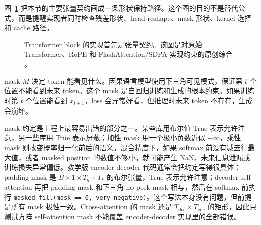 \documentclass[UTF8,zihao=-4,openany]{ctexbook}
\begin{document}
图~\ref{fig:zh-transformer-shape-contract} 把本节的主要张量契约画成一条形状保持路径。这个图的目的不是替代公式，而是提醒实现者同时检查残差形状、head reshape、mask 形状、kernel 选择和 cache 路径。

\begin{figure}[t]
\centering
{}
\caption{Transformer block 的实现首先是张量契约。该图是对原始 Transformer、RoPE 和 FlashAttention/SDPA 实现约束的原创综合 \cite{vaswani2017attention,su2021roformer,dao2022flashattention}。}
\label{fig:zh-transformer-shape-contract}
\end{figure}

mask $M$ 决定 token 能看见什么。因果语言模型使用下三角可见模式，保证第 $t$ 个位置不能看到未来 token。这个 mask 是自回归训练和生成的根本约束。如果训练时第 $t$ 个位置能看到 $x_{t+1}$，loss 会异常好看，但推理时未来 token 不存在，生成会崩坏。

mask 约定是工程上最容易出错的部分之一。某些库用布尔值 True 表示允许注意，另一些库用 True 表示屏蔽；加性 mask 用一个极小负数近似 $-\infty$，乘性 mask 则改变概率归一化前后的语义。混合精度下，如果 softmax 前没有减去行最大值，或者 masked position 的数值不够小，就可能产生 NaN、未来信息泄漏或训练损失异常偏低。教学版 encoder-decoder 代码通常会把约定写得很具体：padding mask 是 $B\times1\times T_q\times T_k$ 的布尔张量，True 表示允许注意；decoder self-attention 再把 padding mask 和下三角 no-peek mask 相与，然后在 softmax 前执行 \texttt{masked\_fill(mask == 0, very\_negative)}。这个写法本身没有问题，但前提是所有 mask 极性一致。Cross-attention 的 mask 还是 $T_{\mathrm{dec}}\times T_{\mathrm{enc}}$ 的矩形，因此只测试方阵 self-attention mask 不能覆盖 encoder-decoder 实现里的全部错误。
\end{document}
